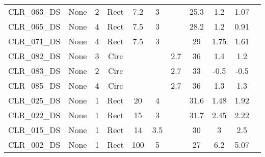 \begin{table}[]
\begin{tabular}{@{}lcccccccccc@{}}
CLR\_063\_DS  & None       & 2        & Rect & 7.2    & 3     &          & 25.3   & 1.2       & 1.07       \\
CLR\_065\_DS  & None       & 4        & Rect & 7.5    & 3     &          & 28.2   & 1.2       & 0.91       \\
CLR\_071\_DS  & None       & 4        & Rect & 7.5    & 3     &          & 29     & 1.75      & 1.61       \\
CLR\_082\_DS  & None       & 3        & Circ &        &       & 2.7      & 36     & 1.4       & 1.2        \\
CLR\_083\_DS  & None       & 2        & Circ &        &       & 2.7      & 33     & -0.5      & -0.5       \\
CLR\_085\_DS  & None       & 4        & Circ &        &       & 2.7      & 36     & 1.3       & 1.3        \\
CLR\_025\_DS  & None       & 1        & Rect & 20     & 4     &          & 31.6   & 1.48      & 1.92       \\
CLR\_022\_DS  & None       & 1        & Rect & 15     & 3     &          & 31.7   & 2.45      & 2.22       \\
CLR\_015\_DS  & None       & 1        & Rect & 14     & 3.5   &          & 30     & 3         & 2.5        \\
CLR\_002\_DS  & None       & 1        & Rect & 100    & 5     &          & 27     & 6.2       & 5.07       \\
\bottomrule
\end{tabular}
\end{table}

